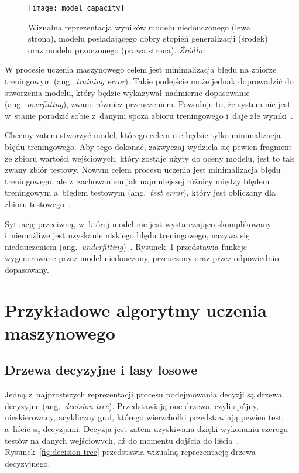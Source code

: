 \begin{figure}[h]
    \centering
    \texttt{[image: model\_capacity]}
    \caption{Wizualna reprezentacja wyników modelu niedouczonego (lewa strona), modelu posiadającego dobry stopień generalizacji (środek) oraz modelu przuczonego (prawa strona). \textit{Źródło:~\cite{Goodfellow2016}}}
    \label{fig:model-capacity}
\end{figure}

W procesie uczenia maszynowego celem jest minimalizacja błędu na zbiorze treningowym (ang.~\textit{training error}).
Takie podejście może jednak doprowadzić do stworzenia modelu, który będzie wykazywał nadmierne dopasowanie (ang.~\textit{overfitting}), zwane również przeuczeniem.
Powoduje to, że system nie jest w~stanie poradzić sobie z~danymi spoza zbioru treningowego i~daje złe wyniki~\cite{Goodfellow2016}.

Chcemy zatem stworzyć model, którego celem nie będzie tylko minimalizacja błędu treningowego.
Aby tego dokonać, zazwyczaj wydziela się pewien fragment ze zbioru wartości wejściowych, który zostaje użyty do oceny modelu, jest to tak zwany zbiór testowy.
Nowym celem procesu uczenia jest minimalizacja błędu treningowego, ale z~zachowaniem jak najmniejszej różnicy między błędem treningowym a~błędem testowym (ang.~\textit{test error}), który jest obliczany dla zbioru testowego~\cite{Goodfellow2016}.

Sytuację przeciwną, w~której model nie jest wystarczająco skomplikowany i~niemożliwe jest uzyskanie niskiego błędu treningowego, nazywa się niedouczeniem (ang.~\textit{underfitting})~\cite{Goodfellow2016}.
Rysunek~\ref{fig:model-capacity} przedstawia funkcje wygenerowane przez model niedouczony, przeuczony oraz przez odpowiednio dopasowany.

\section{Przykładowe algorytmy uczenia maszynowego}\label{sec:przykadowe-algorytmy-uczenia-maszynowego}

\subsection{Drzewa decyzyjne i lasy losowe}\label{subsec:drzewa-decyzyjne-i-lasy-losowe}

Jedną z~najprostszych reprezentacji procesu podejmowania decyzji są drzewa decyzyjne (ang.~\textit{decision tree}).
Przedstawiają one drzewa, czyli spójny, nieskierowany, acykliczny graf, którego wierzchołki przedstawiają pewien test, a~liście są decyzjami.
Decyzja jest zatem uzyskiwana dzięki wykonaniu szeregu testów na danych wejściowych, aż do momentu dojścia do liścia~\cite{Russell2020}.
Rysunek~\ref{fig:decision-tree} przedstawia wizualną reprezentację drzewa decyzyjnego.

